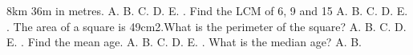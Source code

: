 \documentclass{article}
\begin{document}
\begin{multicols}{2}
8km 36m in metres. \newline \indent A. \newline \indent B. \newline \indent C. \newline \indent D. \newline \indent E.  \newline{}. Find the LCM of 6, 9 and 15 \newline \indent A. \newline \indent B. \newline \indent C. \newline \indent D. \newline \indent E.  \newline{}. The area of a square is 49cm2.What is the perimeter of the square? \newline \indent A. \newline \indent B. \newline \indent C. \newline \indent D. \newline \indent E.  \newline{}. Find the mean age. \newline \indent A. \newline \indent B. \newline \indent C. \newline \indent D. \newline \indent E.  \newline{}. What is the median age? \newline \indent A. \newline \indent B. \newli
\end{multicols}
\end{document}
